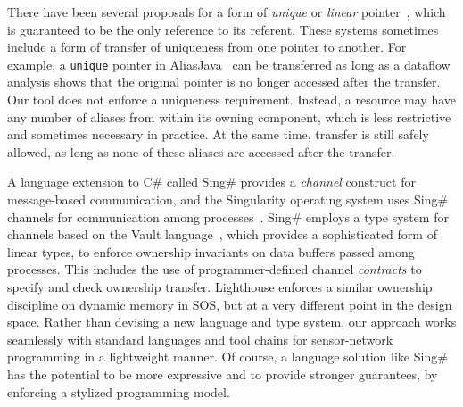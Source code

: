 There have been several proposals for a form of {\em unique} or {\em linear}
pointer~\cite{Boyland:2001:ABU,aliasjava,Wad90:linear}, which is guaranteed
to be the only reference to its referent.  
%
These systems sometimes include a form of transfer of uniqueness from one
pointer to another.
%
For example, a {\tt unique} pointer in AliasJava~\cite{aliasjava} can be
transferred as long as a dataflow analysis shows that the original pointer
is no longer accessed after the transfer.  
%
Our tool does not enforce a uniqueness requirement.
%
Instead, a resource may have any number of aliases from within its owning
component, which is less restrictive and sometimes necessary in practice.
%
At the same time, transfer is still safely allowed, as long as none of these
aliases are accessed after the transfer.



A language extension to C\# called Sing\# provides a {\em channel} construct
for message-based communication, and the Singularity operating system uses
Sing\# channels for communication among
processes~\cite{fahndrich06language}.  
%
Sing\# employs a type system for channels based on the Vault
language~\cite{Vault,adoption-focus}, which provides a sophisticated form of
linear types, to enforce ownership invariants on data buffers passed among
processes.  
%
This includes the use of programmer-defined channel {\em contracts} to
specify and check ownership transfer.
%
Lighthouse enforces a similar ownership discipline on dynamic memory in SOS,
but at a very different point in the design space.  
%
Rather than devising a new language and type system, our approach works
seamlessly with standard languages and tool chains for sensor-network
programming in a lightweight manner.  
%
Of course, a language solution like Sing\# has the potential to be more
expressive and to provide stronger guarantees, by enforcing a stylized
programming model.


